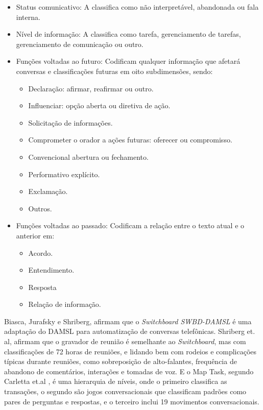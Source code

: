 \documentclass[
	12pt,				%
	oneside,
	a4paper,			%
	english,			%
	french,				%
	spanish,			%
	brazil				%
	]{abntex2}
\begin{document}
\begin{itemize}
	\item 
	Status comunicativo: A classifica como não interpretável, abandonada ou fala interna.
	\item 
	Nível de informação: A classifica como tarefa, gerenciamento de tarefas, gerenciamento de comunicação ou outro.
	\item 
	Funções voltadas ao futuro: Codificam qualquer informação que afetará conversas e classificações futuras em oito subdimensões, sendo:
	\begin{itemize}
		\item Declaração: afirmar, reafirmar ou outro.
		\item Influenciar: opção aberta ou diretiva de ação.
		\item Solicitação de informações.
		\item Comprometer o orador a ações futuras: oferecer ou compromisso.
		\item Convencional abertura ou fechamento.
		\item Performativo explícito.
		\item Exclamação.
		\item Outros.
	\end{itemize}
	\item Funções voltadas ao passado: Codificam a relação entre o texto atual e o anterior em:
	\begin{itemize}
		\item Acordo.
		\item Entendimento.
		\item Resposta
		\item Relação de informação.
	\end{itemize}

\end{itemize}

Biasca, Jurafsky e Shriberg\supercite{dasml-switchboard}, afirmam que o \emph{Switchboard SWBD-DAMSL} é uma adaptação do DAMSL para automatização de conversas telefônicas. Shriberg\supercite{shriberg-etal-2004-icsi} et. al, afirmam que o gravador de reunião é semelhante ao \emph{Switchboard}, mas com classificações de 72 horas de reuniões, e lidando bem com rodeios e complicações típicas durante reuniões, como sobreposição de alto-falantes, frequência de abandono de comentários, interações e tomadas de voz. E o Map Task, segundo Carletta et.al \supercite{map-task}, é uma hierarquia de níveis, onde o primeiro classifica as transações, o segundo são jogos conversacionais que classificam padrões como pares de perguntas e respostas, e o terceiro inclui 19 movimentos conversacionais.
\end{document}
